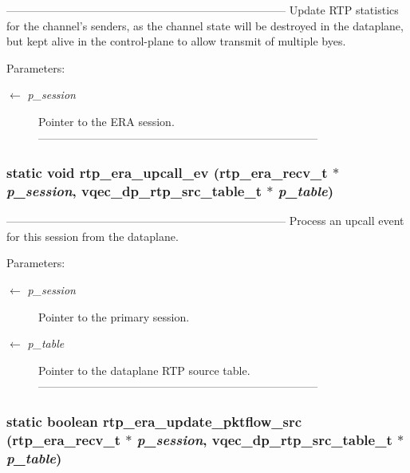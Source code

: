 --------------------------------------------------------------------------- Update RTP statistics for the channel's senders, as the channel state will be destroyed in the dataplane, but kept alive in the control-plane to allow transmit of multiple byes.

\begin{Desc}
\item[Parameters:]
\begin{description}
\item[\mbox{$\leftarrow$} {\em p\_\-session}]Pointer to the ERA session. --------------------------------------------------------------------------- \end{description}
\end{Desc}
\subsubsection{\setlength{\rightskip}{0pt plus 5cm}static void rtp\_\-era\_\-upcall\_\-ev (\bf{rtp\_\-era\_\-recv\_\-t} $\ast$ {\em p\_\-session}, vqec\_\-dp\_\-rtp\_\-src\_\-table\_\-t $\ast$ {\em p\_\-table})\hspace{0.3cm}{\tt  [static]}}\label{rtp__era__recv_8c_ad4a31a9d86f601c65faeef5479b8912}


--------------------------------------------------------------------------- Process an upcall event for this session from the dataplane.

\begin{Desc}
\item[Parameters:]
\begin{description}
\item[\mbox{$\leftarrow$} {\em p\_\-session}]Pointer to the primary session. \item[\mbox{$\leftarrow$} {\em p\_\-table}]Pointer to the dataplane RTP source table. --------------------------------------------------------------------------- \end{description}
\end{Desc}
\subsubsection{\setlength{\rightskip}{0pt plus 5cm}static boolean rtp\_\-era\_\-update\_\-pktflow\_\-src (\bf{rtp\_\-era\_\-recv\_\-t} $\ast$ {\em p\_\-session}, vqec\_\-dp\_\-rtp\_\-src\_\-table\_\-t $\ast$ {\em p\_\-table})\hspace{0.3cm}{\tt  [static]}}\label{rtp__era__recv_8c_0b13fc503623a45dc95dbd5df426e8e4}


